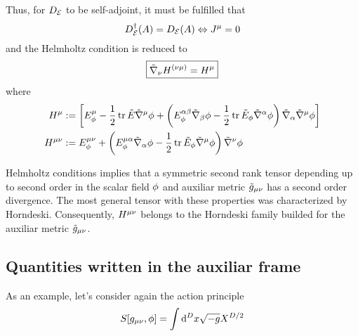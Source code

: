 Thus, for $D_{\mathcal{E}} $ to be self-adjoint, it must be fulfilled that
\begin{equation}
  D^\dagger _{\mathcal{E}} (A)=D_{\mathcal{E}} (A) \Leftrightarrow J^\mu =0
\end{equation}
and the Helmholtz condition is reduced to
\begin{equation}\label{Hemholtz-condition}
\boxed{  \tilde{\nabla}_\nu H^{(\nu\mu) }=H^\mu }
\end{equation}
where 
\begin{align}
  H^\mu &:=\left[E^\mu_\phi -\frac{1}{2}\tr\tilde{E}\tilde{\nabla}^\mu\phi +\left(E^{\alpha\beta }_\phi\tilde{\nabla}_\beta \phi -\frac{1}{2}\tr \tilde{E}_\phi\tilde{\nabla}^\alpha\phi \right)\tilde{\nabla}_\alpha\tilde{\nabla}^\mu\phi \right]\\
  H^{\mu\nu }&:=E^{\mu\nu }_\phi+\left(E^{\mu\alpha }_\phi \tilde{\nabla}_\alpha \phi-\frac{1}{2}\tr\tilde{E}_\phi\tilde{\nabla}^\mu\phi \right)\tilde{\nabla}^\nu\phi 
\end{align}

Helmholtz conditions implies that a symmetric second rank tensor depending up to second order in the scalar field $\phi$ and auxiliar metric $\tilde{g}_{\mu\nu }$ has a second order divergence. The most general tensor with these properties was characterized by Horndeski. Consequently, $H^{\mu\nu }$ belongs to the Horndeski family builded for the auxiliar metric $\tilde{g}_{\mu\nu }$.

\subsection{Quantities written in the auxiliar frame}
As an example, let's consider again the action principle
\begin{equation}\label{S-auxiliar-frame}
  S[g_{\mu\nu },\phi ]=\int\dd^Dx\sqrt{-g}X^{D/2}
\end{equation}

